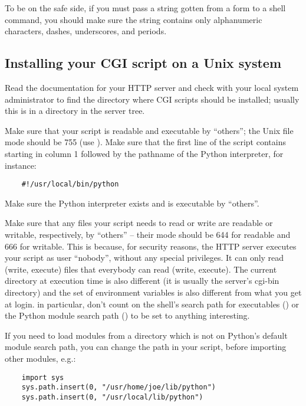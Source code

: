 To be on the safe side, if you must pass a string gotten from a form
to a shell command, you should make sure the string contains only
alphanumeric characters, dashes, underscores, and periods.


\subsection{Installing your CGI script on a Unix system}

Read the documentation for your HTTP server and check with your local
system administrator to find the directory where CGI scripts should be
installed; usually this is in a directory  in the server tree.

Make sure that your script is readable and executable by ``others''; the
Unix file mode should be 755 (use ).  Make sure
that the first line of the script contains \code{\#!} starting in column 1
followed by the pathname of the Python interpreter, for instance:

\begin{verbatim}
	#!/usr/local/bin/python
\end{verbatim}

Make sure the Python interpreter exists and is executable by ``others''.

Make sure that any files your script needs to read or write are
readable or writable, respectively, by ``others'' -- their mode should
be 644 for readable and 666 for writable.  This is because, for
security reasons, the HTTP server executes your script as user
``nobody'', without any special privileges.  It can only read (write,
execute) files that everybody can read (write, execute).  The current
directory at execution time is also different (it is usually the
server's cgi-bin directory) and the set of environment variables is
also different from what you get at login.  in particular, don't count
on the shell's search path for executables () or the Python
module search path () to be set to anything interesting.

If you need to load modules from a directory which is not on Python's
default module search path, you can change the path in your script,
before importing other modules, e.g.:

\begin{verbatim}
	import sys
	sys.path.insert(0, "/usr/home/joe/lib/python")
	sys.path.insert(0, "/usr/local/lib/python")
\end{verbatim}

